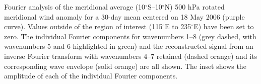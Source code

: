 \label{fig:transform}
Fourier analysis of the meridional average (10$^{\circ}$S--10$^{\circ}$N) 500 hPa rotated meridional wind anomaly for a 30-day mean centered on 18 May 2006 (purple curve). Values outside of the region of interest (115$^{\circ}$E to 235$^{\circ}$E) have been set to zero. The individual Fourier components for wavenumbers 1--8 (grey dashed, with wavenumbers 5 and 6 highlighted in green) and the reconstructed signal from an inverse Fourier transform with wavenumbers 4--7 retained (dashed orange) and its corresponding wave envelope (solid orange) are all shown. The inset shows the amplitude of each of the individual Fourier components. 